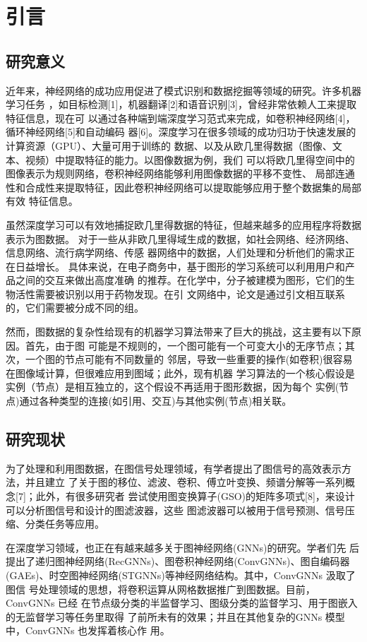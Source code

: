 \cleardoublepage

\section{引言}

\subsection{研究意义}
近年来，神经网络的成功应用促进了模式识别和数据挖掘等领域的研究。许多机器学习任务
，如目标检测[1]，机器翻译[2]和语音识别[3]，曾经非常依赖人工来提取特征信息，现在可
以通过各种端到端深度学习范式来完成，如卷积神经网络[4]，循环神经网络[5]和自动编码
器[6]。深度学习在很多领域的成功归功于快速发展的计算资源（GPU）、大量可用于训练的
数据、以及从欧几里得数据（图像、文本、视频）中提取特征的能力。以图像数据为例，我们
可以将欧几里得空间中的图像表示为规则网络，卷积神经网络能够利用图像数据的平移不变性、
局部连通性和合成性来提取特征，因此卷积神经网络可以提取能够应用于整个数据集的局部有效
特征信息。

虽然深度学习可以有效地捕捉欧几里得数据的特征，但越来越多的应用程序将数据表示为图数据。
对于一些从非欧几里得域生成的数据，如社会网络、经济网络、信息网络、流行病学网络、传感
器网络中的数据，人们处理和分析他们的需求正在日益增长。
具体来说，在电子商务中，基于图形的学习系统可以利用用户和产品之间的交互来做出高度准确
的推荐。在化学中，分子被建模为图形，它们的生物活性需要被识别以用于药物发现。在引
文网络中，论文是通过引文相互联系的，它们需要被分成不同的组。

然而，图数据的复杂性给现有的机器学习算法带来了巨大的挑战，这主要有以下原因。首先，由于图
可能是不规则的，一个图可能有一个可变大小的无序节点；其次，一个图的节点可能有不同数量的
邻居，导致一些重要的操作(如卷积)很容易在图像域计算，但很难应用到图域；此外，现有机器
学习算法的一个核心假设是实例（节点）是相互独立的，这个假设不再适用于图形数据，因为每个
实例(节点)通过各种类型的连接(如引用、交互)与其他实例(节点)相关联。

\subsection{研究现状}
为了处理和利用图数据，在图信号处理领域，有学者提出了图信号的高效表示方法，并且建立
了关于图的移位、滤波、卷积、傅立叶变换、频谱分解等一系列概念[7]；此外，有很多研究者
尝试使用图变换算子(GSO)的矩阵多项式[8]，来设计可以分析图信号和设计的图滤波器，这些
图滤波器可以被用于信号预测、信号压缩、分类任务等应用。

在深度学习领域，也正在有越来越多关于图神经网络(GNNs)的研究。学者们先
后提出了递归图神经网络(RecGNNs)、图卷积神经网络(ConvGNNs)、图自编码器
(GAEs)、时空图神经网络(STGNNs)等神经网络结构。其中，ConvGNNs 汲取了图信
号处理领域的思想，将卷积运算从网格数据推广到图数据。目前，ConvGNNs 已经
在节点级分类的半监督学习、图级分类的监督学习、用于图嵌入的无监督学习等任务里取得
了前所未有的效果；并且在其他复杂的GNNs 模型中，ConvGNNs 也发挥着核心作
用。

